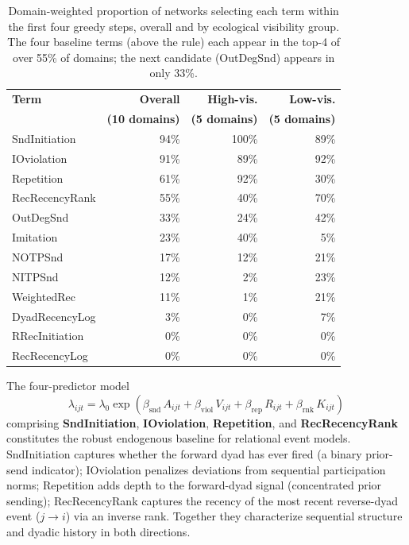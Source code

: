 \documentclass[11pt]{article}
\begin{document}
\begin{table}[H]
\centering
\caption{Domain-weighted proportion of networks selecting each term within the
first four greedy steps, overall and by ecological visibility group. The four
baseline terms (above the rule) each appear in the top-4 of over 55\% of
domains; the next candidate (OutDegSnd) appears in only 33\%.}
\label{tab:top4freq}
\begin{tabular}{lrrr}
\toprule
\textbf{Term} & \textbf{Overall} & \textbf{High-vis.} & \textbf{Low-vis.} \\
              & \textbf{(10 domains)} & \textbf{(5 domains)}  & \textbf{(5 domains)}  \\
\midrule
  SndInitiation    & 94\% & 100\% & 89\% \\
  IOviolation      & 91\% &  89\% & 92\% \\
  Repetition       & 61\% &  92\% & 30\% \\
  RecRecencyRank   & 55\% &  40\% & 70\% \\
\midrule
  OutDegSnd        & 33\% & 24\% & 42\% \\
  Imitation        & 23\% & 40\% &  5\% \\
  NOTPSnd          & 17\% & 12\% & 21\% \\
  NITPSnd          & 12\% &  2\% & 23\% \\
  WeightedRec      & 11\% &  1\% & 21\% \\
  DyadRecencyLog   &  3\% &  0\% &  7\% \\
  RRecInitiation   &  0\% &  0\% &  0\% \\
  RecRecencyLog    &  0\% &  0\% &  0\% \\
\bottomrule
\end{tabular}
\end{table}

The four-predictor model
\[
  \lambda_{ijt} = \lambda_0 \exp\!\left(
    \beta_{\text{snd}}\,A_{ijt}
    + \beta_{\text{viol}}\,V_{ijt}
    + \beta_{\text{rep}}\,R_{ijt}
    + \beta_{\text{rnk}}\,K_{ijt}
  \right)
\]
comprising \textbf{SndInitiation}, \textbf{IOviolation}, \textbf{Repetition},
and \textbf{RecRecencyRank} constitutes the robust endogenous baseline for
relational event models. SndInitiation captures whether the forward dyad has
ever fired (a binary prior-send indicator); IOviolation penalizes deviations from sequential
participation norms; Repetition adds depth to the forward-dyad signal (concentrated
prior sending); RecRecencyRank captures the recency
of the most recent reverse-dyad event ($j \to i$) via an inverse rank.
Together they characterize sequential structure and dyadic history in both
directions.
\end{document}
